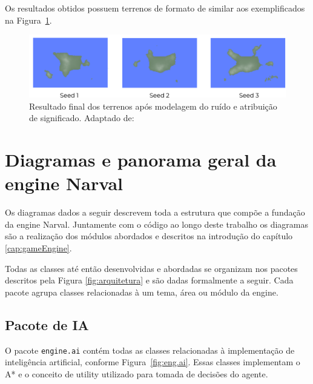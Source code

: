 \documentclass[12pt, 
openright, 
oneside, 
a4paper,    
brazil]{facom-ufu-abntex2}
\begin{document}
Os resultados obtidos possuem terrenos de formato de similar aos exemplificados na Figura~\ref{fig:gter}.

\begin{figure}[H]
	\centering
	\includegraphics[width=34em]{imagens/generatedTerrains.png}
	\caption{Resultado final dos terrenos após modelagem do ruído e atribuição de significado. Adaptado de: \cite{NoiseRedBlob} \label{fig:gter}}
\end{figure}


\chapter{Diagramas e panorama geral da engine Narval}
\label{cap:diagramas}

Os diagramas dados a seguir descrevem toda a estrutura que compõe a fundação da engine Narval. Juntamente com o código ao longo deste trabalho os diagramas são a realização dos módulos abordados e descritos na introdução do capítulo \ref{cap:gameEngine}.

Todas as classes até então desenvolvidas e abordadas se organizam nos pacotes descritos pela Figura \ref{fig:arquitetura} e são dadas formalmente a seguir. Cada pacote agrupa classes relacionadas à um tema, área ou módulo da engine.

\section{Pacote de IA}

O pacote \texttt{engine.ai} contém todas as classes relacionadas à implementação de inteligência artificial, conforme Figura~\ref{fig:eng.ai}. Essas classes implementam o A* e o conceito de utility utilizado para tomada de decisões do agente.
\end{document}
